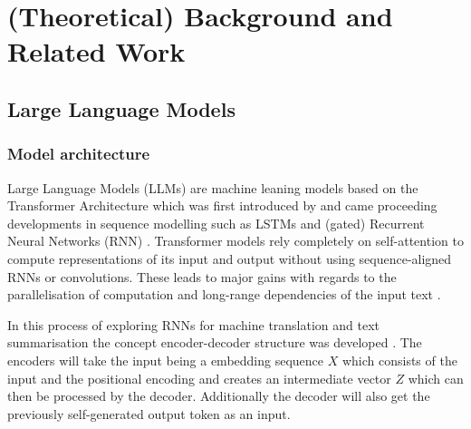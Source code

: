 

\chapter{(Theoretical) Background and Related Work}
\label{chap:background_related-work}


\section{Large Language Models}
\label{sec:llm}
\subsection{Model architecture}
Large Language Models (LLMs) are machine leaning models based on the Transformer Architecture which was first introduced by \citet{vaswani2017attention} and came proceeding developments in sequence modelling such as LSTMs \citep{hochreiter1997long} and (gated) Recurrent Neural Networks (RNN) \citep{cho2014learning}. Transformer models rely completely on self-attention to compute representations of its input and output without using sequence-aligned RNNs or convolutions. These leads to major gains with regards to the parallelisation of computation and long-range dependencies of the input text \cite{kimDHR17}. 

In this process of exploring RNNs for machine translation and text summarisation the concept encoder-decoder structure was developed \cite{sutskever2014sequence}. The encoders will take the input being a embedding sequence $X$ which consists of the input and the positional encoding and creates an intermediate vector $Z$ which can then be processed by the decoder. Additionally the decoder will also get the previously self-generated output token as an input.


